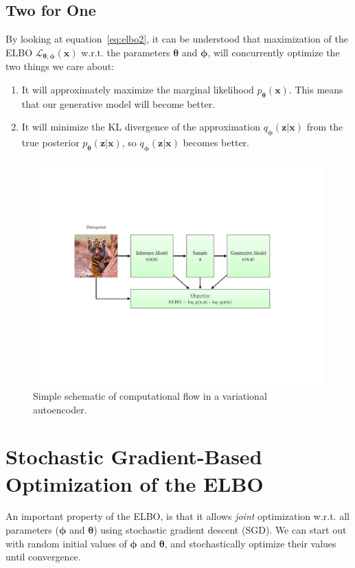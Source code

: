 \documentclass[MAL,biber]{nowfnt} %
\newcommand{\bb}[1]{\mathbf{#1}}
\newcommand{\bx}{\bb{x}}
\newcommand{\bz}{\bb{z}}
\newcommand{\bT}{\boldsymbol{\theta}}
\newcommand{\bphi}{\boldsymbol{\phi}}
\newcommand{\pT}{p_{\bT}}
\newcommand{\qP}{q_{\bphi}}
\newcommand{\ELBO}{\mathcal{L}_{\bT,\bphi}}
\begin{document}
\subsection{Two for One}
By looking at equation~\ref{eq:elbo2}, it can be understood that maximization of the ELBO $\ELBO(\bx)$ w.r.t. the parameters $\bT$ and $\bphi$, will concurrently optimize the two things we care about:
\begin{enumerate}
	\item It will approximately maximize the marginal likelihood $\pT(\bx)$. This means that our generative model will become better.
	\item It will minimize the KL divergence of the approximation $\qP(\bz|\bx)$ from the true posterior $\pT(\bz|\bx)$, so $\qP(\bz|\bx)$ becomes better. 
\end{enumerate}

\begin{figure}[t]
	\centering
	\includegraphics[width=0.90\linewidth]{figures/vae_cartoon}
	\caption{Simple schematic of computational flow in a variational autoencoder.}
	\label{fig:vaecartoon}
\end{figure}

\section{Stochastic Gradient-Based Optimization of the ELBO}

An important property of the ELBO, is that it allows \emph{joint} optimization w.r.t. all parameters ($\bphi$ and $\bT$) using stochastic gradient descent (SGD). We can start out with random initial values of $\bphi$ and $\bT$, and stochastically optimize their values until convergence.
\end{document}
